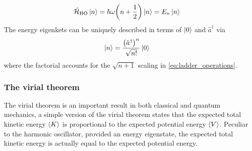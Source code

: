 \documentclass[nofootinbib,reprint,english]{revtex4-1}
\newcommand{\hatHH}{\hat{\mathcal{H}}}
\begin{document}
\begin{equation}\label{eq:harmonic_oscillator_energies}
\hatHH_\text{HO}\ket{n}=\hbar\omega\bigg(n+\frac{1}{2}\bigg)\ket{n}=E_n\ket{n}
\end{equation}
The energy eigenkets can be uniquely described in terms of \(\ket{0}\) and \(\hat{a}^\dagger\) via
\begin{equation}\label{eq:harmonic_oscillator_eigenkets}
\ket{n}=\frac{\big(\hat{a}^\dagger\big)^n}{\sqrt{n!}}\ket{0}
\end{equation}
where the factorial accounts for the \(\sqrt{n+1}\) scaling in \eqref{eq:ladder_operations}.

\subsubsection{The virial theorem}
The virial theorem is an important result in both classical and quantum mechanics, a simple version of the virial theorem states that the expected total kinetic energy \(\expval{K}\) is proportional to the expected potential energy \(\expval{V}\). Peculiar to the harmonic oscillator, provided an energy eigenstate, the expected total kinetic energy is actually equal to the expected potential energy.
\end{document}
